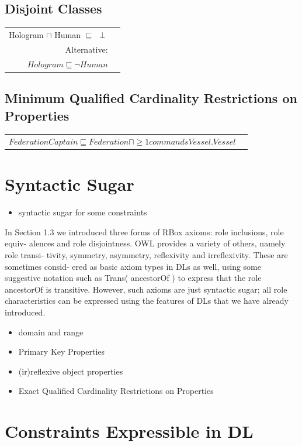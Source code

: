 \documentclass{llncs}
\newenvironment{DL}{
	\begin{center}
  \begin{tabular}{r l}

}{
  \end{tabular}
	\end{center}
}
\begin{document}
\subsection{Disjoint Classes}

\begin{DL}
Hologram $\sqcap$ Human $\sqsubseteq$ $\perp$\\
Alternative:\\
$Hologram \sqsubseteq \neg Human$
\end{DL}

\subsection{Minimum Qualified Cardinality Restrictions on Properties}

\begin{DL}
$FederationCaptain \sqsubseteq Federation \sqcap \geq1 commandsVessel . Vessel $
\end{DL}

\section{Syntactic Sugar}

\begin{itemize}
	\item syntactic sugar for some constraints
\end{itemize}

In Section 1.3 we introduced three forms of RBox axioms: role inclusions, role equiv-
alences and role disjointness. OWL provides a variety of others, namely role transi-
tivity, symmetry, asymmetry, reflexivity and irreflexivity. These are sometimes consid-
ered as basic axiom types in DLs as well, using some suggestive notation such as
Trans( ancestorOf ) to express that the role ancestorOf is transitive. However, such axioms
are just syntactic sugar; all role characteristics can be expressed using the features
of DLs that we have already introduced.

\begin{itemize}
  \item domain and range
	\item Primary Key Properties
	\item (ir)reflexive object properties
	\item Exact Qualified Cardinality Restrictions on Properties
\end{itemize}

\section{Constraints Expressible in DL}
\end{document}

